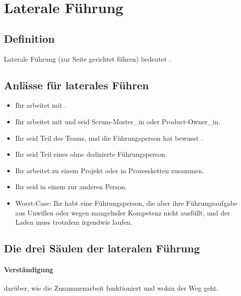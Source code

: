 \section{Laterale Führung}
\label{laterale-führung}


\subsection{Definition}

Laterale Führung (\glqq zur Seite gerichtet führen\grqq) bedeutet .~\cite{kuhl-laterales-fuehren, fuehren-ohne-fuehrung, gtd-when-not-in-charge}

\subsection{Anlässe für laterales Führen}

\begin{itemize}
  \item Ihr arbeitet mit .
  \item Ihr arbeitet mit  und seid Scrum-Master\_in oder Product-Owner\_in.
  \item Ihr seid Teil des Teams, und die Führungsperson hat bewusst .
  \item Ihr seid Teil eines  ohne dedizierte Führungsperson.
  \item Ihr arbeitet  zu einem Projekt oder in Prozessketten zusammen.
  \item Ihr seid in einem  zur anderen Person.
  \item Worst-Case: Ihr habt eine Führungsperson, die aber ihre Führungsaufgabe aus Unwillen oder wegen mangelnder Kompetenz nicht ausfüllt, und der Laden muss trotzdem irgendwie laufen.
\end{itemize}


\subsection{Die drei Säulen der lateralen Führung}

\paragraph{Verständigung} darüber, wie die Zusammenarbeit funktioniert und wohin der Weg geht.

